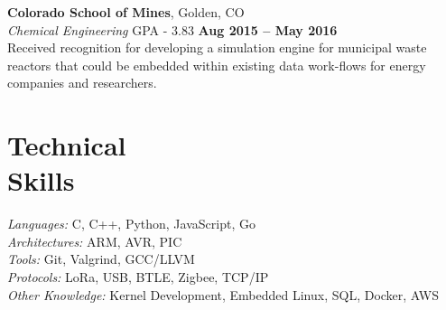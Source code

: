 \documentclass[margin,line]{resume}
\begin{document}
\begin{resume}
    \textbf{Colorado School of Mines}, Golden, CO \vspace{2mm}\\\vspace{1mm}%
    \textsl{Chemical Engineering} GPA - 3.83 \hfill \textbf{Aug 2015 -- May 2016}\\
    Received recognition for developing a simulation engine for municipal waste
    reactors that could be embedded within existing data work-flows for energy
    companies and researchers.

    \section{\mysidestyle Technical\\Skills}

    \emph{Languages:} C, C++, Python, JavaScript, Go\\
    \emph{Architectures:} ARM, AVR, PIC\\
    \emph{Tools:} Git, Valgrind, GCC/LLVM\\
    \emph{Protocols:} LoRa, USB, BTLE, Zigbee, TCP/IP\\
    \emph{Other Knowledge:} Kernel Development, Embedded Linux, SQL, Docker, AWS\\
\end{resume}
\end{document}
